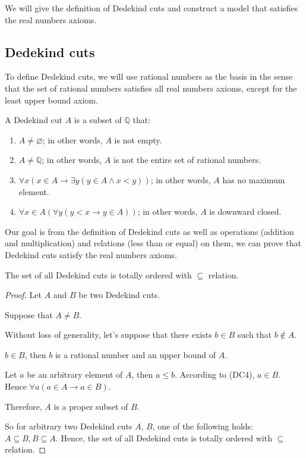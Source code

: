 \documentclass[class=mike-apostol-mathematical-analysis,crop=false]{standalone}
\begin{document}
\par We will give the definition of Dedekind cuts and construct a model that satisfies the real numbers axioms.

\subsection*{Dedekind cuts}

\par To define Dedekind cuts, we will use rational numbers as the basis in the sense that the set of rational numbers satisfies all real numbers axioms, except for the least upper bound axiom.

\begin{definition}
    A Dedekind cut $ A$ is a subset of $\mathbb{Q}$ that:
    \begin{enumerate}[label = (DC\arabic*)]
        \item $ A\ne\varnothing$; in other words, $ A$ is not empty.
        \item $ A\neq\mathbb{Q}$; in other words, $ A$ is not the entire set of rational numbers.
        \item $\forall x\left(x\in A \rightarrow \exists y \left( y\in A \wedge x < y \right)\right)$; in other words, $ A$ has no maximum element.
        \item $\forall x\in A\left(\forall y( y < x \rightarrow y\in A)\right)$; in other words, $ A$ is downward closed.
    \end{enumerate}
\end{definition}

\par Our goal is from the definition of Dedekind cuts as well as operations (addition and multiplication) and relations (less than or equal) on them, we can prove that Dedekind cuts satisfy the real numbers axioms.

\begin{theorem}
    The set of all Dedekind cuts is totally ordered with $\subseteq$ relation.
\end{theorem}

\begin{proof}
    \par Let $ A$ and $ B$ be two Dedekind cuts.
    \par Suppose that $ A\ne B$.
    \par Without loss of generality, let's suppose that there exists $b\in B$ such that $b\notin A$.
    \par $b\in B$, then $b$ is a rational number and an upper bound of $ A$.
    \par Let $a$ be an arbitrary element of $ A$, then $a\le b$. According to (DC4), $a\in B$. Hence $\forall a(a\in A\rightarrow a\in B)$.
    \par Therefore, $ A$ is a proper subset of $ B$.
    \bigskip
    \par So for arbitrary two Dedekind cuts $ A$, $ B$, one of the following holds: $ A\subseteq B,  B\subseteq A$. Hence, the set of all Dedekind cuts is totally ordered with $\subseteq$ relation.
\end{proof}
\end{document}
